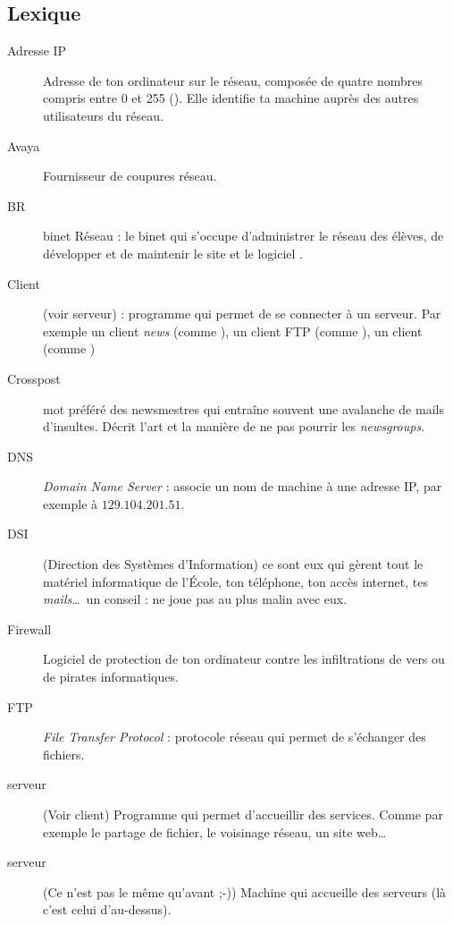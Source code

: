 
\subsection{Lexique}

\begin{description}
  \item[Adresse IP] Adresse de ton ordinateur sur le réseau, composée de quatre nombres compris entre 0 et 255  (). Elle identifie ta machine auprès des autres utilisateurs du réseau.
  \item[Avaya] Fournisseur de coupures réseau.
  \item[BR] binet Réseau : le binet qui s'occupe d'administrer le réseau des élèves, de développer et de maintenir le site  et le logiciel .
  \item[Client] (voir serveur) : programme qui permet de se connecter à un serveur. Par exemple un client \emph{news} (comme ), un client FTP (comme ), un client  (comme )
  \item[Crosspost] mot préféré des newsmestres qui entraîne souvent une avalanche de mails d'insultes. Décrit l'art et la manière de ne pas pourrir les \emph{newsgroups}.
  \item[DNS] \emph{Domain Name Server} : associe un nom de machine à une adresse IP, par exemple  à  $129.104.201.51$.
  \item[DSI] (Direction des Systèmes d'Information) ce sont eux qui gèrent tout le matériel informatique de l'\'Ecole, ton téléphone, ton accès internet, tes \emph{mails}\ldots\ un conseil : ne joue pas au plus malin avec eux.
  \item[Firewall] Logiciel de protection de ton ordinateur contre les infiltrations de vers ou de pirates informatiques.
  \item[FTP] \emph{File Transfer Protocol} : protocole réseau qui permet de s'échanger des fichiers.
  \item[serveur] (Voir client) Programme qui permet d'accueillir des services. Comme par exemple le partage de fichier, le voisinage réseau, un site web\ldots\
  \item[serveur] (Ce n'est pas le même qu'avant ;-)) Machine qui accueille des serveurs (là c'est celui d'au-dessus).

\end{description}
